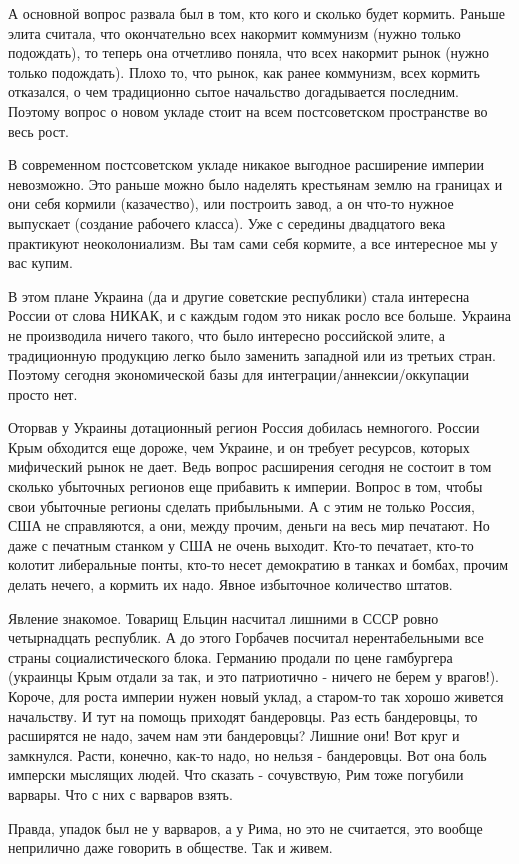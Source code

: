 А основной вопрос развала был в том, кто кого и сколько будет кормить. Раньше
элита считала, что окончательно всех накормит коммунизм (нужно только
подождать), то теперь она отчетливо поняла, что всех накормит рынок (нужно
только подождать). Плохо то, что рынок, как ранее коммунизм, всех кормить
отказался, о чем традиционно сытое начальство догадывается последним. Поэтому
вопрос о новом укладе стоит на всем постсоветском пространстве во весь рост. 

В современном постсоветском укладе никакое выгодное расширение империи
невозможно. Это раньше можно было наделять крестьянам землю на границах и они
себя кормили (казачество), или построить завод, а он что-то нужное выпускает
(создание рабочего класса). Уже с середины двадцатого века практикуют
неоколониализм. Вы там сами себя кормите, а все интересное мы у вас купим. 

В этом плане Украина (да и другие советские республики) стала интересна России
от слова НИКАК, и с каждым годом это никак росло все больше. Украина не
производила ничего такого, что было интересно российской элите, а традиционную
продукцию легко было заменить западной или из третьих стран. Поэтому сегодня
экономической базы для интеграции/аннексии/оккупации просто нет. 

Оторвав у Украины дотационный регион Россия добилась немногого. России Крым
обходится еще дороже, чем Украине, и он требует ресурсов, которых мифический
рынок не дает. Ведь вопрос расширения сегодня не состоит в том сколько
убыточных регионов еще прибавить к империи. Вопрос в том, чтобы свои убыточные
регионы сделать прибыльными. А с этим не только Россия, США не справляются, а
они, между прочим, деньги на весь мир печатают. Но даже с печатным станком у
США не очень выходит. Кто-то печатает, кто-то колотит либеральные понты, кто-то
несет демократию в танках и бомбах, прочим делать нечего, а кормить их надо.
Явное избыточное количество штатов.


Явление знакомое. Товарищ Ельцин насчитал лишними в СССР ровно четырнадцать
республик. А до этого Горбачев посчитал нерентабельными все страны
социалистического блока. Германию продали по цене гамбургера (украинцы Крым
отдали за так, и это патриотично - ничего не берем у врагов!). Короче, для
роста империи нужен новый уклад, а старом-то так хорошо живется начальству. И
тут на помощь приходят бандеровцы. Раз есть бандеровцы, то расширятся не надо,
зачем нам эти бандеровцы? Лишние они! Вот круг и замкнулся. Расти, конечно,
как-то надо, но нельзя - бандеровцы. Вот она боль имперски мыслящих людей. Что
сказать - сочувствую, Рим тоже погубили варвары. Что с них с варваров взять.

Правда, упадок был не у варваров, а у Рима, но это не считается, это вообще
неприлично даже говорить в обществе. Так и живем.
